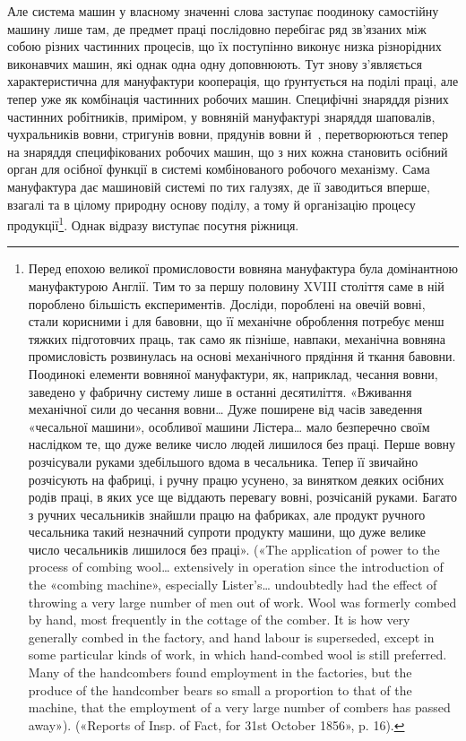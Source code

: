 Але система машин у власному значенні слова заступає
поодиноку самостійну машину лише там, де предмет праці послідовно
перебігає ряд зв’язаних між собою різних частинних
процесів, що їх поступінно виконує низка різнорідних виконавчих
машин, які однак одна одну доповнюють. Тут знову з’являється
характеристична для мануфактури кооперація, що ґрунтується
на поділі праці, але тепер уже як комбінація частинних
робочих машин. Специфічні знаряддя різних частинних робітників,
приміром, у вовняній мануфактурі знаряддя шаповалів,
чухральників вовни, стригунів вовни, прядунів вовни й~,
перетворюються тепер на знаряддя специфікованих робочих машин,
що з них кожна становить осібний орган для осібної функції
в системі комбінованого робочого механізму. Сама мануфактура
дає машиновій системі по тих галузях, де її заводиться вперше,
взагалі та в цілому природну основу поділу, а тому й організацію
процесу продукції\footnote{
Перед епохою великої промисловости вовняна мануфактура була
домінантною мануфактурою Англії. Тим то за першу половину XVIII століття
саме в ній пороблено більшість експериментів. Досліди, пороблені
на овечій вовні, стали корисними і для бавовни, що її механічне
оброблення потребує менш тяжких підготовчих праць, так само як пізніше,
навпаки, механічна вовняна промисловість розвинулась на основі
механічного прядіння й ткання бавовни. Поодинокі елементи вовняної
мануфактури, як, наприклад, чесання вовни, заведено у фабричну систему
лише в останні десятиліття. «Вживання механічної сили до чесання вовни\dots{}
Дуже поширене від часів заведення «чесальної машини», особливої машини
Лістера\dots{} мало безперечно своїм наслідком те, що дуже велике число
людей лишилося без праці. Перше вовну розчісували руками здебільшого
вдома в чесальника. Тепер її звичайно розчісують на фабриці, і ручну
працю усунено, за винятком деяких осібних родів праці, в яких усе ще віддають
перевагу вовні, розчісаній руками. Багато з ручних чесальників
знайшли працю на фабриках, але продукт ручного чесальника такий незначний
супроти продукту машини, що дуже велике число чесальників
лишилося без праці». («The application of power to the process of combing
wool\dots{} extensively in operation since the introduction of the «combing
machine», especially Lister’s\dots{} undoubtedly had the effect of throwing
a very large number of men out of work. Wool was formerly combed by
hand, most frequently in the cottage of the comber. It is how very generally
combed in the factory, and hand labour is superseded, except in some particular
kinds of work, in which hand-combed wool is still preferred. Many
of the handcombers found employment in the factories, but the produce of
the handcomber bears so small a proportion to that of the machine, that
the employment of a very large number of combers has passed away»). («Reports
of Insp. of Fact, for 31st October 1856», p. 16).
}. Однак відразу виступає посутня ріжниця.
